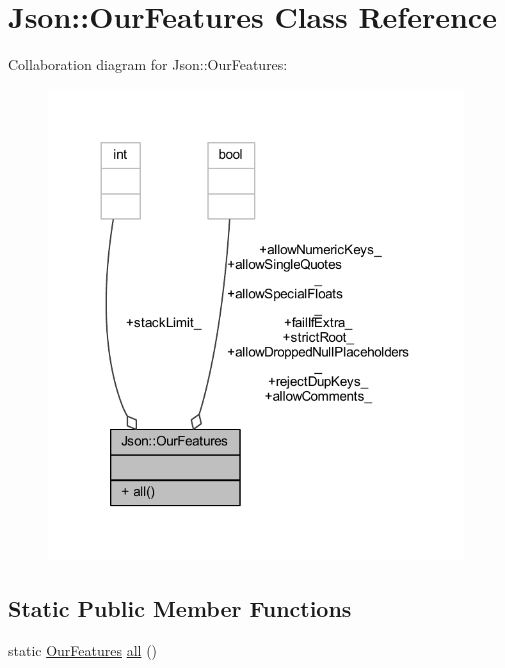 \hypertarget{class_json_1_1_our_features}{}\section{Json\+:\+:Our\+Features Class Reference}
\label{class_json_1_1_our_features}


Collaboration diagram for Json\+:\+:Our\+Features\+:\nopagebreak
\begin{figure}[H]
\begin{center}
\leavevmode
\includegraphics[width=312pt]{class_json_1_1_our_features__coll__graph}
\end{center}
\end{figure}
\subsection*{Static Public Member Functions}
\begin{DoxyCompactItemize}
\item 
static \hyperlink{class_json_1_1_our_features}{Our\+Features} \hyperlink{class_json_1_1_our_features_a0686e1406b6677f496529f9f3fe98d1e}{all} ()
\end{DoxyCompactItemize}
